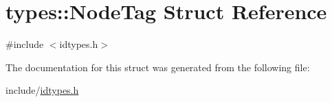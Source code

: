 \hypertarget{structtypes_1_1_node_tag}{}\section{types\+::Node\+Tag Struct Reference}
\label{structtypes_1_1_node_tag}


{\ttfamily \#include $<$idtypes.\+h$>$}



The documentation for this struct was generated from the following file\+:\begin{DoxyCompactItemize}
\item 
include/\mbox{\hyperlink{idtypes_8h}{idtypes.\+h}}\end{DoxyCompactItemize}
